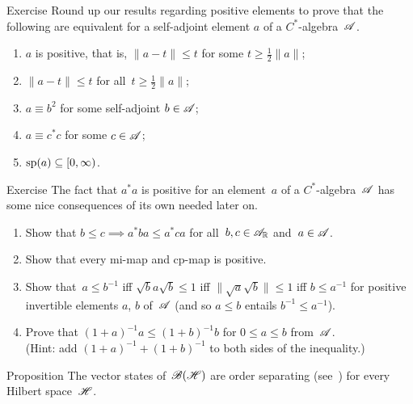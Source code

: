 \documentclass[a]{subfiles}
\begin{document}
\begin{parsec}
\begin{point}{Exercise}%
%
Round up our results regarding positive elements
to 
prove that
the following are equivalent
for a self-adjoint element $a$ of a $C^*$-algebra~$\mathscr{A}$.
\begin{enumerate}
\item 
$a$ is positive, that is,  $\|a-t\|\leq t$
for some $t\geq \frac{1}{2}\|a\|$;
\item
$\|a-t\|\leq t$ for all~$t\geq \frac{1}{2}\|a\|$;
\item
$a\equiv b^2$ for some self-adjoint $b\in\mathscr{A}$;
\item
$a\equiv c^* c$ for some $c\in\mathscr{A}$;
\item
$\mathrm{sp}(a)\subseteq [0,\infty)$.
\end{enumerate}
\end{point}
\begin{point}{Exercise}%
The fact that $a^*a$ is positive
for an element~$a$ of a $C^*$-algebra~$\mathscr{A}$
has some nice consequences
of its own needed later on.
\begin{enumerate}
\item
Show that $b\leq c\implies a^*ba \leq a^*ca$
for all~$b,c\in\mathscr{A}_{\mathbb{R}}$ and~$a\in\mathscr{A}$.
\item
Show that every mi-map and cp-map is positive.
\item
Show that~$a\leq b^{-1}$ 
iff $\sqrt{b}a\sqrt{b}\leq 1$
iff $\|\sqrt{a}\sqrt{b}\|\leq 1$
iff $b\leq a^{-1}$
for positive invertible elements $a$, $b$ of~$\mathscr{A}$
(and so $a\leq b$ entails $b^{-1}\leq a^{-1}$).
\item
Prove that $(1+a)^{-1}a\leq (1+b)^{-1}b$
for $0\leq a\leq b$ from~$\mathscr{A}$.\\
(Hint: add $(1+a)^{-1} + (1+b)^{-1}$
to both sides of the inequality.)
\end{enumerate}
\end{point}
\begin{point}{Proposition}%
The vector states
of~$\mathscr{B}(\mathscr{H})$
are order separating (see~)
for every Hilbert space~$\mathscr{H}$.
\end{point}
\end{parsec}
\end{document}
